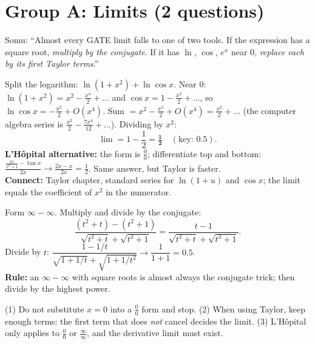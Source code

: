 \documentclass[11pt,a4paper]{article}
\begin{document}
\section{Group A: Limits (2 questions)}

\begin{story}
Somu: ``Almost every GATE limit falls to one of two tools. If the expression has a square root, \emph{multiply by the conjugate}. If it has $\ln$, $\cos$, $e^x$ near $0$, \emph{replace each by its first Taylor terms}.''
\end{story}

\begin{example}
Split the logarithm: $\ln(1+x^2)+\ln\cos x$. Near $0$: $\ln(1+x^2)=x^2-\frac{x^4}2+\dots$ and $\cos x=1-\frac{x^2}2+\dots$, so $\ln\cos x=-\frac{x^2}2+O(x^4)$. Sum $=x^2-\frac{x^2}2+O(x^4)=\frac{x^2}2+\dots$ (the computer algebra series is $\frac{x^2}2-\frac{7x^4}{12}+\dots$). Dividing by $x^2$:
\[\lim=1-\frac12=\mathbf{\tfrac12}\quad(\text{key: }0.5).\]
\textbf{L'H\^opital alternative:} the form is $\frac00$; differentiate top and bottom: $\frac{\frac{2x}{x^2+1}-\tan x}{2x}\to\frac{2x-x}{2x}=\frac12$. Same answer, but Taylor is faster.\\
\textbf{Connect:} Taylor chapter, standard series for $\ln(1+u)$ and $\cos x$; the limit equals the coefficient of $x^2$ in the numerator.
\end{example}

\begin{example}
Form $\infty-\infty$. Multiply and divide by the conjugate:
\[\frac{(t^2+t)-(t^2+1)}{\sqrt{t^2+t}+\sqrt{t^2+1}}=\frac{t-1}{\sqrt{t^2+t}+\sqrt{t^2+1}}.\]
Divide by $t$: $\dfrac{1-1/t}{\sqrt{1+1/t}+\sqrt{1+1/t^2}}\to\dfrac{1}{1+1}=\mathbf{0.5}$.\\
\textbf{Rule:} an $\infty-\infty$ with square roots is almost always the conjugate trick; then divide by the highest power.
\end{example}

\begin{trap}
(1) Do not substitute $x=0$ into a $\frac00$ form and stop. (2) When using Taylor, keep enough terms: the first term that does \emph{not} cancel decides the limit. (3) L'H\^opital only applies to $\frac00$ or $\frac\infty\infty$, and the derivative limit must exist.
\end{trap}
\end{document}

